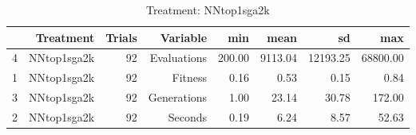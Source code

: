 \begin{table}[ht]
\centering
\begin{tabular}{rrrrrrrr}
  \hline
 & Treatment & Trials & Variable & min & mean & sd & max \\ 
  \hline
4 & NNtop1sga2k &  92 & Evaluations & 200.00 & 9113.04 & 12193.25 & 68800.00 \\ 
  1 & NNtop1sga2k &  92 & Fitness & 0.16 & 0.53 & 0.15 & 0.84 \\ 
  3 & NNtop1sga2k &  92 & Generations & 1.00 & 23.14 & 30.78 & 172.00 \\ 
  2 & NNtop1sga2k &  92 & Seconds & 0.19 & 6.24 & 8.57 & 52.63 \\ 
   \hline
\end{tabular}
\caption{Treatment: NNtop1sga2k} 
\end{table}
